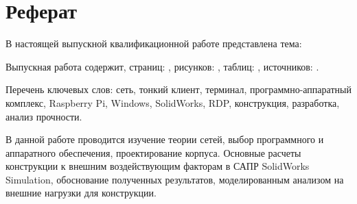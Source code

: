 \chapter*{Реферат}

В настоящей выпускной квалификационной работе представлена тема:

Выпускная работа содержит, страниц: \pageref{LastPage}, рисунков: \totalfigures,
таблиц: \totaltables, источников: .

Перечень ключевых слов: сеть, тонкий клиент, терминал, программно-аппаратный комплекс,
Raspberry Pi, Windows, SolidWorks, RDP, конструкция, разработка, анализ прочности.

В данной работе проводится изучение теории сетей, выбор программного и аппаратного
обеспечения, проектирование корпуса.  Основные расчеты конструкции к внешним
воздействующим факторам в САПР SolidWorks Simulation, обоснование полученных
результатов, моделированным анализом на внешние нагрузки для конструкции.
